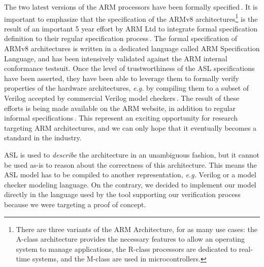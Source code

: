 The two latest versions of the ARM processors have been formally
specified\,\cite{fox2010armv7,reid2016armv8}.
%
It is important to emphasize that the specification of the ARMv8
architectures\footnote{There are three variants of the ARM Architecture, for as
  many use cases: the A-class architecture provides the necessary features to
  allow an operating system to manage applications, the R-class processors are
  dedicated to real-time systems, and the M-class are used in microcontrollers.}
is the result of an important 5 year effort by ARM Ltd to integrate formal
specification definition to their regular specification
process\,\cite{reid2016armv8}.
%
The formal specification of ARMv8 architectures is written in a dedicated
language called ARM Specification Language, and has been intensively validated
against the ARM internal conformance testsuit.
%
Once the level of trustworthiness of the ASL specifications have been asserted,
they have been able to leverage them to formally verify properties of the
hardware architectures, \emph{e.g.} by compiling them to a subset of Verilog
accepted by commercial Verilog model checkers\,\cite{reid2016end}.
%
The result of these efforts is being made available on the ARM website, in
addition to regular informal specifications\,\cite{arm2018aspec}.
%
This represent an exciting opportunity for research targeting ARM architectures,
and we can only hope that it eventually becomes a standard in the industry.

ASL is used to \emph{describe} the architecture in an unambiguous fashion, but
it cannot be used as-is to reason about the correctness of this architecture.
%
This means the ASL model has to be compiled to another representation,
\emph{e.g.} Verilog or a model checker modeling language.
%
On the contrary, we decided to implement our model directly in the language used
by the tool supporting our verification process because we were targeting a
proof of concept.

